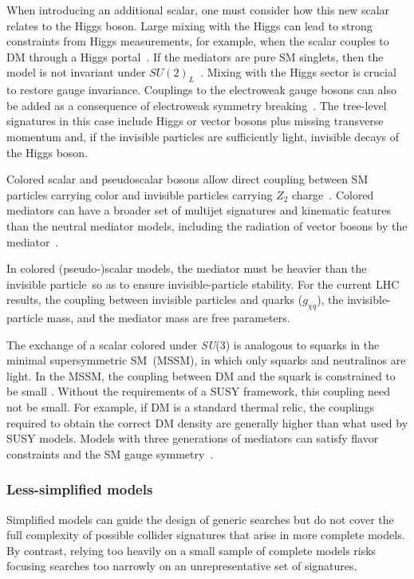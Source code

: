 \documentclass{ar-1col}
\newcommand{\chiDM}{\ensuremath{\chi}\xspace}
\newcommand{\IP}{invisible particle}
\newcommand{\gdmq}{\ensuremath{g_{\chiDM q}}\xspace}
\begin{document}
When introducing an additional scalar, one must consider how this new
scalar relates to the Higgs boson. Large mixing with the Higgs can
lead to strong constraints from Higgs measurements, for example,
when the scalar couples to DM through a Higgs
portal~\cite{Berlin:2014cfa}. If the mediators are pure SM
singlets, then the model is not invariant under
$SU(2)_L$~\cite{Bell:2016ekl}. Mixing
with the Higgs sector is crucial to restore gauge invariance. Couplings to the electroweak
gauge bosons can also be added as a consequence of electroweak
symmetry breaking~\cite{Bauer:2016gys,Englert:2016joy}. The
tree-level signatures in this case include Higgs or vector bosons
plus missing transverse momentum and, if the {\IP}s are
sufficiently light, invisible decays of the Higgs boson.

{Colored scalar and pseudoscalar bosons} allow direct
coupling between SM particles carrying color and {\IP}s carrying $Z_2$
charge~\cite{Bai:2013iqa, Papucci:2014iwa, An:2013xka,
Bell:2012rg}. Colored mediators can have a broader set of
multijet signatures and kinematic features than the neutral
mediator models, including the radiation of vector bosons by the
mediator~\cite{Bell:2012rg}.

In colored (pseudo-)scalar models, the mediator must be heavier
than the \IP\ so as  to ensure invisible-particle stability. For the current LHC results,
the coupling between {\IP}s and quarks (\gdmq), the invisible-particle  mass, and
the mediator mass are free parameters.

The exchange of a scalar colored under \textit{SU}(3) is analogous to
squarks in the minimal supersymmetric SM\ (MSSM), in which only squarks and neutralinos are light.
In the MSSM, the coupling between DM and the squark is constrained
to be small \cite{Abercrombie:2015wmb}. Without the requirements
of a SUSY framework, this coupling need not be small. For example,
if DM is a standard thermal relic, the couplings required to
obtain the correct DM density are generally higher than
what used by SUSY models. Models with three generations of
mediators can satisfy flavor constraints and the SM gauge
symmetry~\cite{Ko:2016zxg}.

\subsubsection{Less-simplified models}\label{sec:LessSimplifiedModels}

Simplified models can guide the design of generic searches but do
not cover the full complexity of possible collider signatures that
arise in more complete models. By contrast, relying too
heavily on a small sample of complete models risks focusing
searches too narrowly on an unrepresentative set of signatures.
\end{document}
